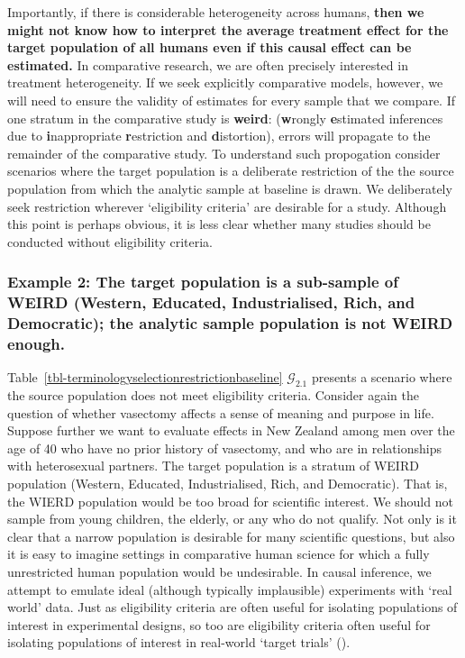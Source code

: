 \documentclass[
  single column]{article}
\begin{document}
Importantly, if there is considerable heterogeneity across humans,
\textbf{then we might not know how to interpret the average treatment
effect for the target population of all humans even if this causal
effect can be estimated.} In comparative research, we are often
precisely interested in treatment heterogeneity. If we seek explicitly
comparative models, however, we will need to ensure the validity of
estimates for every sample that we compare. If one stratum in the
comparative study is \textbf{weird}: (\textbf{w}rongly
\textbf{e}stimated inferences due to \textbf{i}nappropriate
\textbf{r}estriction and \textbf{d}istortion), errors will propagate to
the remainder of the comparative study. To understand such propogation
consider scenarios where the target population is a deliberate
restriction of the the source population from which the analytic sample
at baseline is drawn. We deliberately seek restriction wherever
`eligibility criteria' are desirable for a study. Although this point is
perhaps obvious, it is less clear whether many studies should be
conducted without eligibility criteria.

\subsubsection{Example 2: The target population is a sub-sample of WEIRD
(Western, Educated, Industrialised, Rich, and Democratic); the analytic
sample population is not WEIRD
enough.}\label{example-2-the-target-population-is-a-sub-sample-of-weird-western-educated-industrialised-rich-and-democratic-the-analytic-sample-population-is-not-weird-enough.}

Table~\ref{tbl-terminologyselectionrestrictionbaseline}
\(\mathcal{G}_{2.1}\) presents a scenario where the source population
does not meet eligibility criteria. Consider again the question of
whether vasectomy affects a sense of meaning and purpose in life.
Suppose further we want to evaluate effects in New Zealand among men
over the age of 40 who have no prior history of vasectomy, and who are
in relationships with heterosexual partners. The target population is a
stratum of WEIRD population (Western, Educated, Industrialised, Rich,
and Democratic). That is, the WIERD population would be too broad for
scientific interest. We should not sample from young children, the
elderly, or any who do not qualify. Not only is it clear that a narrow
population is desirable for many scientific questions, but also it is
easy to imagine settings in comparative human science for which a fully
unrestricted human population would be undesirable. In causal inference,
we attempt to emulate ideal (although typically implausible) experiments
with `real world' data. Just as eligibility criteria are often useful
for isolating populations of interest in experimental designs, so too
are eligibility criteria often useful for isolating populations of
interest in real-world `target trials'
().
\end{document}
